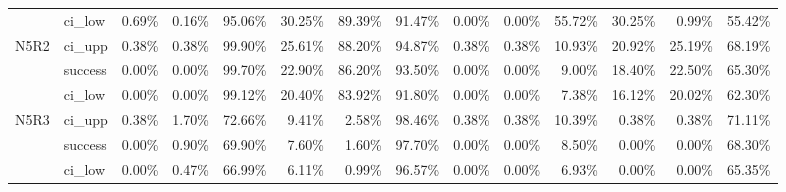 \begin{tabular}{llrrrrrrrrrrrr}
     & ci\_low &       0.69\% &  0.16\% & 95.06\% & 30.25\% & 89.39\% & 91.47\% &        0.00\% &  0.00\% & 55.72\% & 30.25\% &  0.99\% & 55.42\% \\
N5R2 & ci\_upp &       0.38\% &  0.38\% & 99.90\% & 25.61\% & 88.20\% & 94.87\% &        0.38\% &  0.38\% & 10.93\% & 20.92\% & 25.19\% & 68.19\% \\
     & success &       0.00\% &  0.00\% & 99.70\% & 22.90\% & 86.20\% & 93.50\% &        0.00\% &  0.00\% &  9.00\% & 18.40\% & 22.50\% & 65.30\% \\
     & ci\_low &       0.00\% &  0.00\% & 99.12\% & 20.40\% & 83.92\% & 91.80\% &        0.00\% &  0.00\% &  7.38\% & 16.12\% & 20.02\% & 62.30\% \\
N5R3 & ci\_upp &       0.38\% &  1.70\% & 72.66\% &  9.41\% &  2.58\% & 98.46\% &        0.38\% &  0.38\% & 10.39\% &  0.38\% &  0.38\% & 71.11\% \\
     & success &       0.00\% &  0.90\% & 69.90\% &  7.60\% &  1.60\% & 97.70\% &        0.00\% &  0.00\% &  8.50\% &  0.00\% &  0.00\% & 68.30\% \\
     & ci\_low &       0.00\% &  0.47\% & 66.99\% &  6.11\% &  0.99\% & 96.57\% &        0.00\% &  0.00\% &  6.93\% &  0.00\% &  0.00\% & 65.35\% \\
\bottomrule
\end{tabular}

